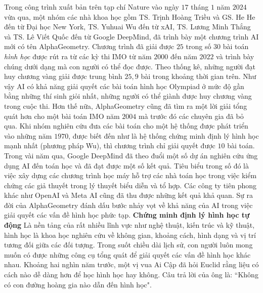 \begin{multicols}{2}
	Trong công trình xuất bản trên tạp chí Nature vào ngày $17$ tháng $1$ năm $2024$ vừa qua, một nhóm các nhà khoa học gồm TS. Trịnh Hoàng Triều  và GS. He He đến từ Đại học New York, TS. Yuhuai Wu đến từ xAI, TS. Lương Minh Thắng và TS. Lê Viết Quốc đến từ Google DeepMind, đã trình bày một chương trình AI mới có tên AlphaGeometry. Chương trình đã giải được $25$ trong số $30$ bài toán \textit{hình học} được rút ra từ các kỳ thi IMO từ năm $2000$ đến năm $2022$ và trình bày chúng dưới dạng mà con người có thể đọc được. Theo thống kê, những người đạt huy chương vàng giải được trung bình $25,9$ bài trong khoảng thời gian trên. Như vậy AI có khả năng giải quyết các bài toán hình học Olympiad ở mức độ gần bằng những thí sinh giỏi nhất, những người có thể giành được huy chương vàng trong cuộc thi. Hơn thế nữa, AlphaGeometry cũng đã tìm ra một lời giải tổng quát hơn cho một bài toán IMO năm $2004$ mà trước đó các chuyên gia đã bỏ qua. Khi nhóm nghiên cứu đưa các bài toán cho một hệ thống được phát triển vào những năm $1970$, được biết đến như là hệ thống chứng minh định lý hình học mạnh nhất (phương pháp Wu), thì chương trình chỉ giải quyết được $10$ bài toán.
	\vskip 0.1cm
	Trong vài năm qua, Google DeepMind đã theo đuổi một số dự án nghiên cứu ứng dụng AI đến toán học và đã đạt được một số kết quả. Tiêu biểu trong số đó là việc xây dựng các chương trình học máy hỗ trợ các nhà toán học trong việc kiểm chứng các giả thuyết trong lý thuyết biểu diễn và tổ hợp. Các công ty tiên phong khác như OpenAI và Meta AI cũng đã thu được những kết quả khả quan. Sự ra đời của AlphaGeometry đánh dấu bước nhảy vọt về khả năng của AI trong việc giải quyết các vấn đề hình học phức tạp.
	\vskip 0.1cm
	\textbf{\color{timhieukhoahoc}Chứng minh định lý hình học tự động}
	\vskip 0.1cm
	Là nền tảng của rất nhiều lĩnh vực như nghệ thuật, kiến trúc và kỹ thuật, hình học là khoa học nghiên cứu về không gian, khoảng cách, hình dạng và vị trí tương đối giữa các đối tượng. Trong suốt chiều dài lịch sử, con người luôn mong muốn có được những công cụ tổng quát để giải quyết các vấn đề hình học khác nhau. Khoảng hai nghìn năm trước, một vị vua Ai Cập đã hỏi Euclid rằng liệu có cách nào dễ dàng hơn để học hình học hay không. Câu trả lời của ông là: ``Không có con đường hoàng gia nào dẫn đến hình học". 
	\begin{figure}[H]
		\vspace*{-5pt}
		\centering
		\captionsetup{labelformat= empty, justification=centering}

\end{figure}
\end{multicols}
